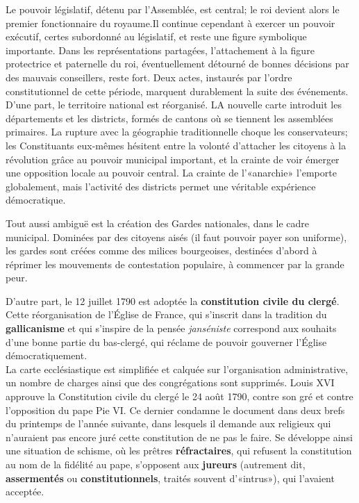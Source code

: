 \documentclass[
  french,
  letterpaper,
  DIV=11,
  numbers=noendperiod]{scrartcl}
\begin{document}
Le pouvoir législatif, détenu par l'Assemblée, est central; le roi
devient alors le premier fonctionnaire du royaume.Il continue cependant
à exercer un pouvoir exécutif, certes subordonné au législatif, et reste
une figure symbolique importante. Dans les représentations partagées,
l'attachement à la figure protectrice et paternelle du roi,
éventuellement détourné de bonnes décisions par des mauvais conseillers,
reste fort. Deux actes, instaurés par l'ordre constitutionnel de cette
période, marquent durablement la suite des événements. D'une part, le
territoire national est réorganisé. LA nouvelle carte introduit les
départements et les districts, formés de cantons où se tiennent les
assemblées primaires. La rupture avec la géographie traditionnelle
choque les conservateurs; les Constituants eux-mêmes hésitent entre la
volonté d'attacher les citoyens à la révolution grâce au pouvoir
municipal important, et la crainte de voir émerger une opposition locale
au pouvoir central. La crainte de l'«anarchie» l'emporte globalement,
mais l'activité des districts permet une véritable expérience
démocratique.

Tout aussi ambiguë est la création des Gardes nationales, dans le cadre
municipal. Dominées par des citoyens aisés (il faut pouvoir payer son
uniforme), les gardes sont créées comme des milices bourgeoises,
destinées d'abord à réprimer les mouvements de contestation populaire, à
commencer par la grande peur.

D'autre part, le 12 juillet 1790 est adoptée la \textbf{constitution
civile du clergé}. Cette réorganisation de l'Église de France, qui
s'inscrit dans la tradition du \textbf{gallicanisme} et qui s'inspire de
la pensée \emph{janséniste} correspond aux souhaits d'une bonne partie
du bas-clergé, qui réclame de pouvoir gouverner l'Église
démocratiquement.\\
La carte ecclésiastique est simplifiée et calquée sur l'organisation
administrative, un nombre de charges ainsi que des congrégations sont
supprimés. Louis XVI approuve la Constitution civile du clergé le 24
août 1790, contre son gré et contre l'opposition du pape Pie VI. Ce
dernier condamne le document dans deux brefs du printemps de l'année
suivante, dans lesquels il demande aux religieux qui n'auraient pas
encore juré cette constitution de ne pas le faire. Se développe ainsi
une situation de schisme, où les prêtres \textbf{réfractaires}, qui
refusent la constitution au nom de la fidélité au pape, s'opposent aux
\textbf{jureurs} (autrement dit, \textbf{assermentés} ou
\textbf{constitutionnels}, traités souvent d'«intrus»), qui l'avaient
acceptée.
\end{document}
